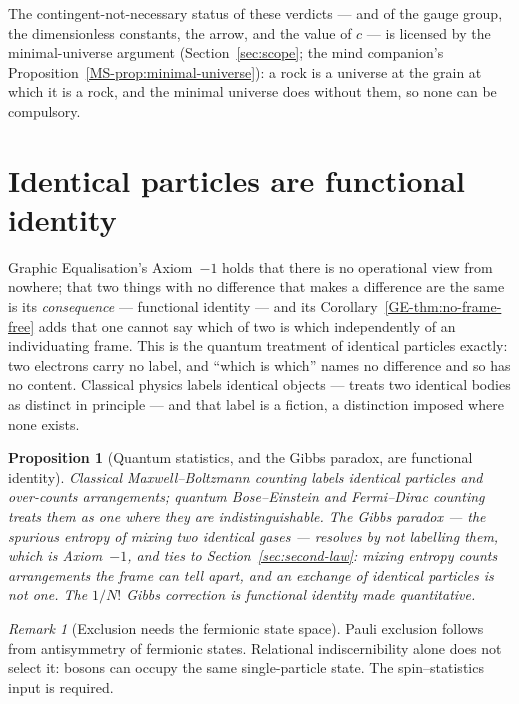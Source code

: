 \documentclass[11pt,a4paper]{article}
\newtheorem{proposition}[definition]{Proposition}
\theoremstyle{remark}\newtheorem{remark}[definition]{Remark}
\begin{document}
The contingent-not-necessary status of these verdicts --- and of the gauge group,
the dimensionless constants, the arrow, and the value of $c$ --- is licensed by the
minimal-universe argument (Section~\ref{sec:scope}; the mind companion's
Proposition~\ref{MS-prop:minimal-universe}): a rock is a universe at the
grain at which it is a rock, and the minimal universe does without them, so none
can be compulsory.

\section{Identical particles are functional identity}\label{sec:identical}
Graphic Equalisation's Axiom~$-1$ holds that there is no operational view from
nowhere; that two things with no difference that makes a difference are the same
is its \emph{consequence} --- functional identity --- and its
Corollary~\ref{GE-thm:no-frame-free} adds that one cannot say which of two is which
independently of an individuating frame. This is
the quantum treatment of identical particles exactly: two electrons carry no
label, and ``which is which'' names no difference and so has no content.
Classical physics labels identical objects --- treats two identical bodies as
distinct in principle --- and that label is a fiction, a distinction imposed
where none exists.

\begin{proposition}[Quantum statistics, and the Gibbs paradox, are functional identity]\label{prop:gibbs}
Classical Maxwell--Boltzmann counting labels identical particles and over-counts
arrangements; quantum Bose--Einstein and Fermi--Dirac counting treats them as one
where they are indistinguishable. The Gibbs paradox --- the spurious entropy of
mixing two identical gases --- resolves by not labelling them, which is
Axiom~$-1$, and ties to Section~\ref{sec:second-law}: mixing entropy counts
arrangements the frame can tell apart, and an exchange of identical particles is
not one. The $1/N!$ Gibbs correction is functional identity made
quantitative.
\end{proposition}

\begin{remark}[Exclusion needs the fermionic state space]\label{cor:pauli}
Pauli exclusion follows from antisymmetry of fermionic states. Relational
indiscernibility alone does not select it: bosons can occupy the same
single-particle state. The spin--statistics input is required.
\end{remark}
\end{document}
